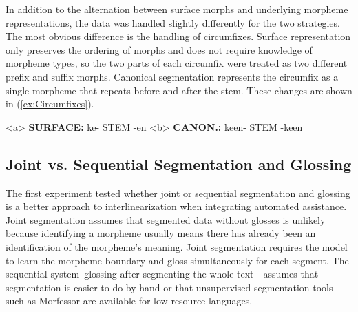 In addition to the alternation between surface morphs and underlying morpheme representations, the data was handled slightly differently for the two strategies. The most obvious difference is the handling of circumfixes. Surface representation only preserves the ordering of morphs and does not require knowledge of morpheme types, so the two parts of each circumfix were treated as two different prefix and suffix morphs.  Canonical segmentation represents the circumfix as a single morpheme that repeats before and after the stem. These changes are shown in (\ref{ex:Circumfixes}).

\pex   
\label{ex:Circumfixes}
\a<a> \textbf{SURFACE:} \hspace{2 mm} ke- \hspace{4 mm}  STEM  \hspace{1 mm} -en
\label{ex:circumsurf}
\a<b> \textbf{CANON.:} \hspace{1 mm} ke\textlangle{}\textrangle{}en- \hspace{1 mm} STEM \hspace{1 mm} -ke\textlangle{}\textrangle{}en
\label{ex:circumcan}
\xe



\subsection{Joint vs. Sequential Segmentation and Glossing}
\label{sec:joint}

The first experiment tested whether joint or sequential segmentation and glossing is a better approach to interlinearization when integrating automated assistance. Joint segmentation assumes that segmented data without glosses is unlikely because identifying a morpheme usually means there has already been an identification of the morpheme's meaning.
Joint segmentation requires the model to learn the morpheme boundary and gloss simultaneously for each segment. The sequential system--glossing after segmenting the whole text---assumes that segmentation is easier to do by hand or that unsupervised segmentation tools such as Morfessor \citep{smit-etal-2014-morfessor} are available for low-resource languages. 

